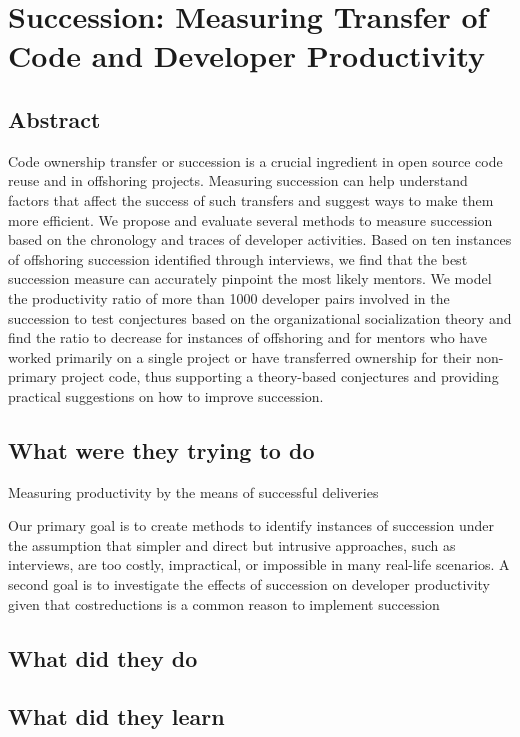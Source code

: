 \section{Succession: Measuring Transfer of Code and Developer Productivity}

\subsection{Abstract}

Code ownership transfer or succession is a crucial
ingredient in open source code reuse and in offshoring
projects. Measuring succession can help understand
factors that affect the success of such transfers and
suggest ways to make them more efficient. We propose and evaluate several methods to measure succession based on the chronology and traces of developer
activities. Based on ten instances of offshoring succession identified through interviews, we find that the best
succession measure can accurately pinpoint the most
likely mentors. We model the productivity ratio of more
than 1000 developer pairs involved in the succession to
test conjectures based on the organizational socialization theory and find the ratio to decrease for instances
of offshoring and for mentors who have worked primarily on a single project or have transferred ownership for their non-primary project code, thus supporting a theory-based conjectures and providing practical
suggestions on how to improve succession.

\subsection{What were they trying to do}

Measuring productivity by the means of successful deliveries

Our primary goal is to create methods to identify instances
of succession under the assumption that simpler and
direct but intrusive approaches, such as interviews, are
too costly, impractical, or impossible in many real-life
scenarios. A second goal is to investigate the effects of
succession on developer productivity given that costreductions is a common reason to implement succession

\subsection{What did they do}



\subsection{What did they learn}



